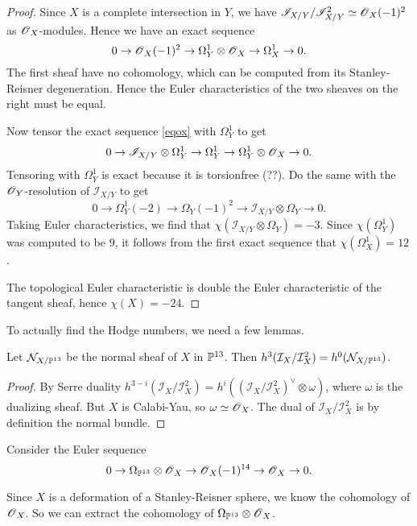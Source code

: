 \documentclass[11pt, english]{article}
\begin{document}
\begin{proof}
Since $X$ is a complete intersection in $Y$, we have $\mathscr I_{X/Y}/\mathscr I_{X/Y}^2 \simeq \operatorname{\mathscr{O}}_X(-1)^2$ as $\operatorname{\mathscr{O}}_X$-modules. Hence we have an exact sequence
\[
0 \to \operatorname{\mathscr{O}}_X(-1)^2 \to \Omega_Y^1 \otimes \operatorname{\mathscr{O}}_X \to \Omega_X^1 \to 0.
\]
The first sheaf have no cohomology, which can be computed from its Stanley-Reisner degeneration. Hence the Euler characteristics of the two sheaves on the right must be equal.

Now tensor the exact sequence \eqref{eqox} with $\Omega_Y^1$ to get
\[
0 \to \mathscr I_{X/Y} \otimes \Omega_Y^1 \to \Omega_Y^1 \to \Omega_Y^1 \otimes \operatorname{\mathscr{O}}_X \to 0.
\]
Tensoring with $\Omega_Y^1$ is exact because it is torsionfree (??). Do the same with the $\operatorname{\mathscr{O}}_Y$-resolution of $\mathscr I_{X/Y}$ to get
\[
0 \to \Omega_Y^1(-2) \to \Omega_Y(-1)^2 \to \mathscr I_{X/Y} \otimes \Omega_Y \to 0.
\]
Taking Euler characteristics, we find that $\chi(\mathscr I_{X/Y} \otimes \Omega_Y)=-3$. Since $\chi(\Omega_Y^1)$ was computed to be $9$, it follows from the first exact sequence that $\chi(\Omega_X^1)=12$.

The topological Euler characteristic is double the Euler characteristic of the tangent sheaf, hence $\chi(X)=-24$.
\end{proof}

To actually find the Hodge numbers, we need a few lemmas.

\begin{lemma}
\label{lemmanormal}
Let $\mathcal N_{X/\mathbb{P}^{13}}$ be the normal sheaf of $X$ in $\mathbb{P}^{13}$. Then $h^3(\mathcal I_X/\mathcal I_X^2) = h^0(\mathcal N_{X/\mathbb{P}^{13}})$.
\end{lemma}
\begin{proof}
By Serre duality $h^{3-i}(\mathcal I_X/\mathcal I_X^2)=h^{i}((\mathcal I_X/\mathcal I_X^2)^\vee \otimes \omega)$, where $\omega$ is the dualizing sheaf. But $X$ is Calabi-Yau, so $\omega \simeq \operatorname{\mathscr{O}}_X$. The dual of $\mathcal I_X/\mathcal I_X^2$ is by definition the normal bundle.
\end{proof}

Consider the Euler sequence
\[
0 \to \Omega_{\mathbb{P}^{13}} \otimes \operatorname{\mathscr{O}}_{X} \to \operatorname{\mathscr{O}}_{X}(-1)^{14} \to \operatorname{\mathscr{O}}_X \to 0.
\]

Since $X$ is a deformation of a Stanley-Reisner sphere, we know the cohomology of $\operatorname{\mathscr{O}}_X$. So we can extract the cohomology of $\Omega_{\mathbb{P}^{13}} \otimes \operatorname{\mathscr{O}}_X$.
\end{document}
